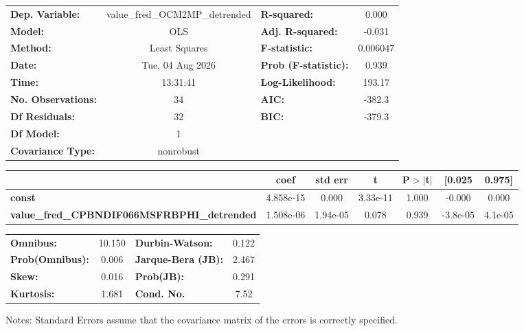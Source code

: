 \begin{center}
\begin{tabular}{lclc}
\toprule
\textbf{Dep. Variable:}                             & value\_fred\_OCM2MP\_detrended & \textbf{  R-squared:         } &     0.000   \\
\textbf{Model:}                                     &              OLS               & \textbf{  Adj. R-squared:    } &    -0.031   \\
\textbf{Method:}                                    &         Least Squares          & \textbf{  F-statistic:       } &  0.006047   \\
\textbf{Date:}                                      &        Tue, 04 Aug 2026        & \textbf{  Prob (F-statistic):} &    0.939    \\
\textbf{Time:}                                      &            13:31:41            & \textbf{  Log-Likelihood:    } &    193.17   \\
\textbf{No. Observations:}                          &                 34             & \textbf{  AIC:               } &    -382.3   \\
\textbf{Df Residuals:}                              &                 32             & \textbf{  BIC:               } &    -379.3   \\
\textbf{Df Model:}                                  &                  1             & \textbf{                     } &             \\
\textbf{Covariance Type:}                           &           nonrobust            & \textbf{                     } &             \\
\bottomrule
\end{tabular}
\begin{tabular}{lcccccc}
                                                    & \textbf{coef} & \textbf{std err} & \textbf{t} & \textbf{P$> |$t$|$} & \textbf{[0.025} & \textbf{0.975]}  \\
\midrule
\textbf{const}                                      &    4.858e-15  &        0.000     &  3.33e-11  &         1.000        &       -0.000    &        0.000     \\
\textbf{value\_fred\_CPBNDIF066MSFRBPHI\_detrended} &    1.508e-06  &     1.94e-05     &     0.078  &         0.939        &     -3.8e-05    &      4.1e-05     \\
\bottomrule
\end{tabular}
\begin{tabular}{lclc}
\textbf{Omnibus:}       & 10.150 & \textbf{  Durbin-Watson:     } &    0.122  \\
\textbf{Prob(Omnibus):} &  0.006 & \textbf{  Jarque-Bera (JB):  } &    2.467  \\
\textbf{Skew:}          &  0.016 & \textbf{  Prob(JB):          } &    0.291  \\
\textbf{Kurtosis:}      &  1.681 & \textbf{  Cond. No.          } &     7.52  \\
\bottomrule
\end{tabular}
\end{center}

Notes: \newline
 [1] Standard Errors assume that the covariance matrix of the errors is correctly specified.